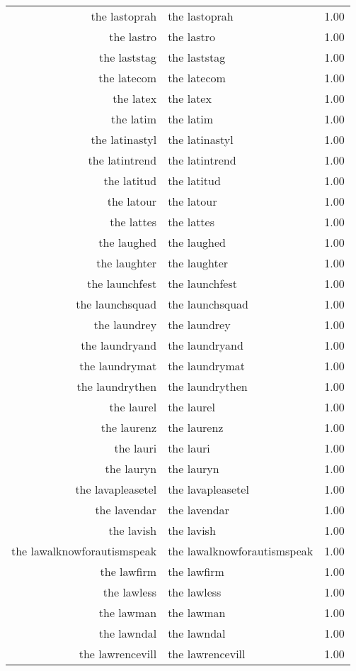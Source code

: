 \begin{table}[ht]
\begin{tabular}{rlr}
  the lastoprah & the lastoprah & 1.00 \\ 
  the lastro & the lastro & 1.00 \\ 
  the laststag & the laststag & 1.00 \\ 
  the latecom & the latecom & 1.00 \\ 
  the latex & the latex & 1.00 \\ 
  the latim & the latim & 1.00 \\ 
  the latinastyl & the latinastyl & 1.00 \\ 
  the latintrend & the latintrend & 1.00 \\ 
  the latitud & the latitud & 1.00 \\ 
  the latour & the latour & 1.00 \\ 
  the lattes & the lattes & 1.00 \\ 
  the laughed & the laughed & 1.00 \\ 
  the laughter & the laughter & 1.00 \\ 
  the launchfest & the launchfest & 1.00 \\ 
  the launchsquad & the launchsquad & 1.00 \\ 
  the laundrey & the laundrey & 1.00 \\ 
  the laundryand & the laundryand & 1.00 \\ 
  the laundrymat & the laundrymat & 1.00 \\ 
  the laundrythen & the laundrythen & 1.00 \\ 
  the laurel & the laurel & 1.00 \\ 
  the laurenz & the laurenz & 1.00 \\ 
  the lauri & the lauri & 1.00 \\ 
  the lauryn & the lauryn & 1.00 \\ 
  the lavapleasetel & the lavapleasetel & 1.00 \\ 
  the lavendar & the lavendar & 1.00 \\ 
  the lavish & the lavish & 1.00 \\ 
  the lawalknowforautismspeak & the lawalknowforautismspeak & 1.00 \\ 
  the lawfirm & the lawfirm & 1.00 \\ 
  the lawless & the lawless & 1.00 \\ 
  the lawman & the lawman & 1.00 \\ 
  the lawndal & the lawndal & 1.00 \\ 
  the lawrencevill & the lawrencevill & 1.00 \\ 

\end{tabular}
\end{table}
